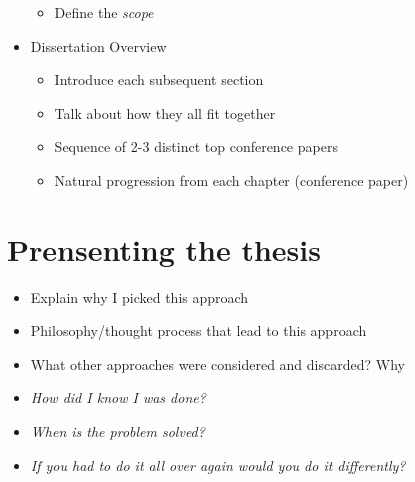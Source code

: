 \begin{itemize}
\begin{itemize}
            \item Define the \emph{scope}
        \end{itemize}
    \item Dissertation Overview
        \begin{itemize}
            \item Introduce each subsequent section
            \item Talk about how they all fit together
            \item Sequence of 2-3 distinct top conference papers
            \item Natural progression from each chapter (conference paper)
        \end{itemize}

        
\end{itemize}

\section{Prensenting the thesis}
\begin{itemize}
    \item Explain why I picked this approach
    \item Philosophy/thought process that lead to this approach
    \item What other approaches were considered and discarded? Why
    \item \emph{How did I know I was done?}
    \item \emph{When is the problem solved?}
    \item \emph{If you had to do it all over again would you do it differently?}
\end{itemize}

